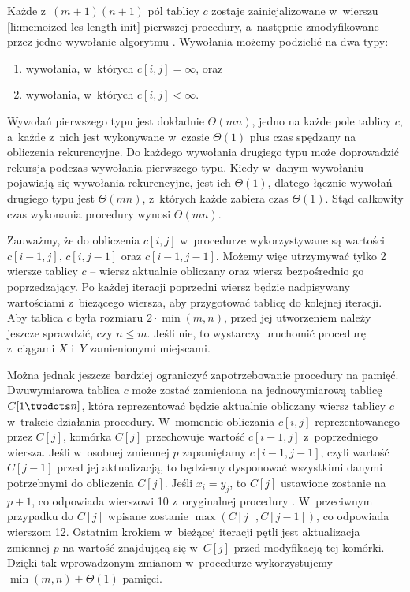 Każde z~$(m+1)(n+1)$ pól tablicy $c$ zostaje zainicjalizowane w~wierszu \ref{li:memoized-lcs-length-init} pierwszej procedury, a~następnie zmodyfikowane przez jedno wywołanie algorytmu .
Wywołania  możemy podzielić na dwa typy:
\begin{enumerate}
	\renewcommand{\labelenumi}{(\roman{enumi})}
	\item wywołania, w~których $c[i,j]=\infty$, oraz
	\item wywołania, w~których $c[i,j]<\infty$.
\end{enumerate}
Wywołań pierwszego typu jest dokładnie $\Theta(mn)$, jedno na każde pole tablicy $c$, a~każde z~nich jest wykonywane w~czasie $\Theta(1)$ plus czas spędzany na obliczenia rekurencyjne.
Do każdego wywołania drugiego typu może doprowadzić rekursja podczas wywołania pierwszego typu.
Kiedy w~danym wywołaniu  pojawiają się wywołania rekurencyjne, jest ich $\Theta(1)$, dlatego łącznie wywołań drugiego typu jest $\Theta(mn)$, z~których każde zabiera czas $\Theta(1)$.
Stąd całkowity czas wykonania procedury  wynosi $\Theta(mn)$.

\exercise %
Zauważmy, że do obliczenia $c[i,j]$ w~procedurze  wykorzystywane są wartości $c[i-1,j]$, $c[i,j-1]$ oraz $c[i-1,j-1]$.
Możemy więc utrzymywać tylko 2 wiersze tablicy $c$ -- wiersz aktualnie obliczany oraz wiersz bezpośrednio go poprzedzający.
Po każdej iteracji poprzedni wiersz będzie nadpisywany wartościami z~bieżącego wiersza, aby przygotować tablicę do kolejnej iteracji.
Aby tablica $c$ była rozmiaru $2\cdot\min(m,n)$, przed jej utworzeniem należy jeszcze sprawdzić, czy $n\le m$.
Jeśli nie, to wystarczy uruchomić procedurę z~ciągami $X$ i~$Y$ zamienionymi miejscami.

Można jednak jeszcze bardziej ograniczyć zapotrzebowanie procedury na pamięć.
Dwuwymiarowa tablica $c$ może zostać zamieniona na jednowymiarową tablicę $C[1\twodots n]$, która reprezentować będzie aktualnie obliczany wiersz tablicy $c$ w~trakcie działania procedury.
W~momencie obliczania $c[i,j]$ reprezentowanego przez $C[j]$, komórka $C[j]$ przechowuje wartość $c[i-1,j]$ z~poprzedniego wiersza.
Jeśli w~osobnej zmiennej $p$ zapamiętamy $c[i-1,j-1]$, czyli wartość $C[j-1]$ przed jej aktualizacją, to będziemy dysponować wszystkimi danymi potrzebnymi do obliczenia $C[j]$.
Jeśli $x_i=y_j$, to $C[j]$ ustawione zostanie na $p+1$, co odpowiada wierszowi 10 z~oryginalnej procedury .
W~przeciwnym przypadku do $C[j]$ wpisane zostanie $\max(C[j],C[j-1])$, co odpowiada wierszom 12.
Ostatnim krokiem w~bieżącej iteracji pętli jest aktualizacja zmiennej $p$ na wartość znajdującą się w~$C[j]$ przed modyfikacją tej komórki.
Dzięki tak wprowadzonym zmianom w~procedurze wykorzystujemy $\min(m,n)+\Theta(1)$ pamięci.

